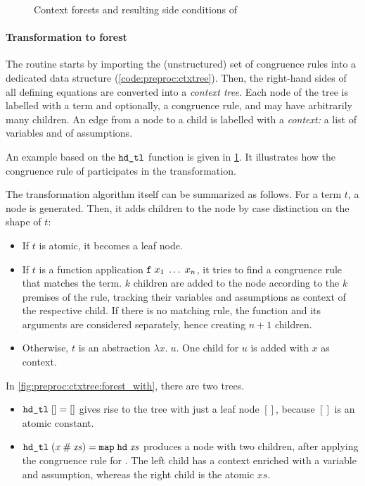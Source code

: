 \begin{figure}[t]
  \caption{Context forests and resulting side conditions of }
  \label{fig:preproc:ctxtree}
\end{figure}

\paragraph{Transformation to forest}
The routine starts by importing the (unstructured) set of congruence rules into a dedicated data structure (\cref{code:preproc:ctxtree}).
Then, the right-hand sides of all defining equations are converted into a \emph{context tree.}
Each node of the tree is labelled with a term and optionally, a congruence rule, and may have arbitrarily many children.
An edge from a node to a child is labelled with a \emph{context:}
a list of variables and of assumptions.


\noindent
An example based on the $\texttt{\textup{hd\_tl}}$ function is given in \cref{fig:preproc:ctxtree}.
It illustrates how the congruence rule of  participates in the transformation.

The transformation algorithm itself can be summarized as follows.
For a term $t$, a node is generated.
Then, it adds children to the node by case distinction on the shape of $t$:
\begin{itemize}
  \item
    If $t$ is atomic, it becomes a leaf node.
  \item
    If $t$ is a function application $\texttt{\textup{f}}\;x_1\;\ldots\;x_n$, it tries to find a congruence rule that matches the term.
    $k$ children are added to the node according to the $k$ premises of the rule, tracking their variables and assumptions as context of the respective child.
    If there is no matching rule, the function and its arguments are considered separately, hence creating $n+1$ children.
  \item
    Otherwise, $t$ is an abstraction $\lambda x.\;u$.
    One child for $u$ is added with $x$ as context.
\end{itemize}

\noindent
In \cref{fig:preproc:ctxtree:forest_with}, there are two trees.
\begin{itemize}
  \item $\texttt{\textup{hd\_tl}}\;[] = []$ gives rise to the tree with just a leaf node $[]$, because $[]$ is an atomic constant.
  \item $\texttt{\textup{hd\_tl}}\;(x \mathbin{\mathtt{\#}} \mathit{xs}) = \texttt{\textup{map}}\;\texttt{\textup{hd}}\;\mathit{xs}$ produces a node with two children, after applying the congruence rule for .
    The left child has a context enriched with a variable and assumption, whereas the right child is the atomic $\mathit{xs}$.
\end{itemize}

